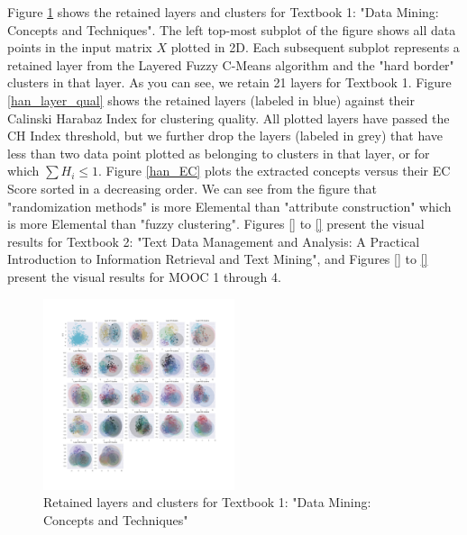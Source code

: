 Figure \ref{han_clusters} shows the retained layers and clusters for Textbook 1: "Data Mining: Concepts and Techniques". The left top-most subplot of the figure shows all data points in the input matrix $X$ plotted in 2D. Each subsequent subplot represents a retained layer from the Layered Fuzzy C-Means algorithm and the "hard border" clusters in that layer. As you can see, we retain 21 layers for Textbook 1. Figure \ref{han_layer_qual} shows the retained layers (labeled in blue) against their Calinski Harabaz Index for clustering quality. All plotted layers have passed the CH Index threshold, but we further drop the layers (labeled in grey) that have less than two data point plotted as belonging to clusters in that layer, or for which $\sum H_{i} \leq 1$. Figure \ref{han_EC} plots the extracted concepts versus their EC Score sorted in a decreasing order. We can see from the figure that "randomization methods" is more Elemental than "attribute construction" which is more Elemental than "fuzzy clustering". Figures \ref{} to \ref{} present the visual results for Textbook 2: "Text Data Management and Analysis: A Practical Introduction to Information Retrieval and Text Mining", and Figures \ref{} to \ref{} present the visual results for MOOC 1 through 4. 

\begin{figure}[t]
	\includegraphics[width=0.5\textwidth, left]{figures/han_bidi_clusters_1.png}
	\caption{Retained layers and clusters for Textbook 1: "Data Mining: Concepts and Techniques"}
	\label{han_clusters}
\end{figure}

